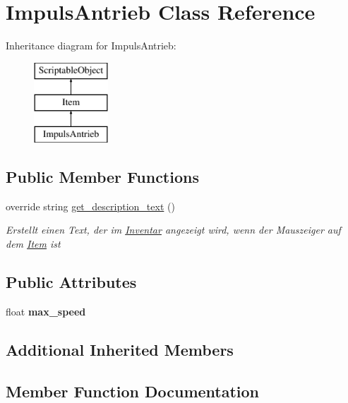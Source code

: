 \hypertarget{class_impuls_antrieb}{}\section{Impuls\+Antrieb Class Reference}
\label{class_impuls_antrieb}
Inheritance diagram for Impuls\+Antrieb\+:\begin{figure}[H]
\begin{center}
\leavevmode
\includegraphics[height=3.000000cm]{class_impuls_antrieb}
\end{center}
\end{figure}
\subsection*{Public Member Functions}
\begin{DoxyCompactItemize}
\item 
override string \hyperlink{class_impuls_antrieb_ad9c1cf88503eecd20366493ac6f6b855}{get\+\_\+description\+\_\+text} ()
\begin{DoxyCompactList}\small\item\em Erstellt einen Text, der im \hyperlink{class_inventar}{Inventar} angezeigt wird, wenn der Mauszeiger auf dem \hyperlink{class_item}{Item} ist \end{DoxyCompactList}\end{DoxyCompactItemize}
\subsection*{Public Attributes}
\begin{DoxyCompactItemize}
\item 
\mbox{\label{class_impuls_antrieb_a70ddf69ae8d2105f7a0720a0d58c15e4}} 
float {\bfseries max\+\_\+speed}
\end{DoxyCompactItemize}
\subsection*{Additional Inherited Members}


\subsection{Member Function Documentation}
\mbox{\label{class_impuls_antrieb_ad9c1cf88503eecd20366493ac6f6b855}} 
